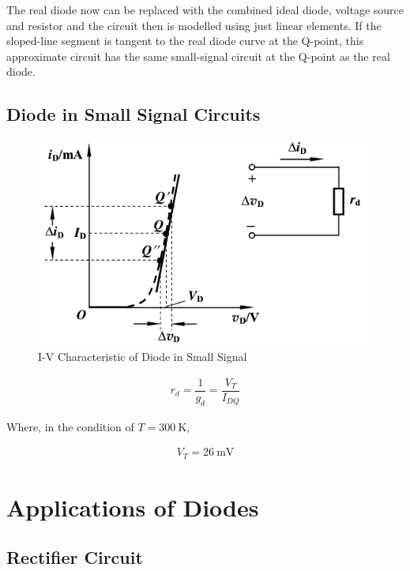 The real diode now can be replaced with the combined ideal diode, voltage source and resistor and the circuit then is modelled using just linear elements. If the sloped-line segment is tangent to the real diode curve at the Q-point, this approximate circuit has the same small-signal circuit at the Q-point as the real diode.

\subsection{Diode in Small Signal Circuits}

\begin{figure}[H]
  \centering
  \includegraphics[width=0.5\linewidth]{figures/Diode-Small-Signal}
  \caption{I-V Characteristic of Diode in Small Signal}
  \label{fig:}
\end{figure}

\begin{equation*}
  \begin{aligned}
    r_d = \dfrac{1}{g_d} = \dfrac{V_T}{I_{DQ}}  
  \end{aligned}
\end{equation*}

Where, in the condition of $T = 300 \  \mathrm{K}$,

\begin{equation*}
  \begin{aligned}
    V_T = 26 \  \mathrm{mV}
  \end{aligned}
\end{equation*}

\section{Applications of Diodes}

\subsection{Rectifier Circuit}


